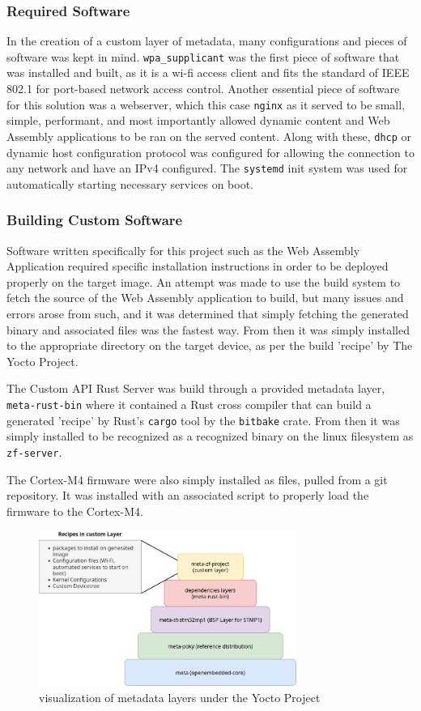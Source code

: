 \documentclass[12pt]{article}
\begin{document}
\subsubsection{Required Software}
In the creation of a custom layer of metadata, many configurations and pieces of software was kept in mind.
\verb+wpa_supplicant+ was the first piece of software that was installed and built, as it is a wi-fi access client
and fits the standard of IEEE 802.1 for port-based network access control. Another essential piece of software
for this solution was a webserver, which this case \verb+nginx+ as it served to be small, simple, performant, and most importantly
allowed dynamic content and Web Assembly applications to be ran on the served content. Along with these, \verb+dhcp+ or 
dynamic host configuration protocol was configured for allowing the connection to any network and have an IPv4 configured.
The \verb+systemd+ init system was used for automatically starting necessary services on boot.

\subsubsection{Building Custom Software}
Software written specifically for this project such as the Web Assembly Application required specific installation
instructions in order to be deployed properly on the target image. An attempt was made to use the build system to
fetch the source of the Web Assembly application to build, but many issues and errors arose from such, and it was
determined that simply fetching the generated binary and associated files was the fastest way. From then it was simply installed
to the appropriate directory on the target device, as per the build 'recipe' by The Yocto Project.

The Custom API Rust Server was build through a provided metadata layer, \verb+meta-rust-bin+ where it contained
a Rust cross compiler that can build a generated 'recipe' by Rust's \verb+cargo+ tool by the \verb+bitbake+ crate. From
then it was simply installed to be recognized as a recognized binary on the linux filesystem as \verb+zf-server+.

The Cortex-M4 firmware were also simply installed as files, pulled from a git repository. It was installed with
an associated script to properly load the firmware to the Cortex-M4.

\begin{figure}[H]
  \includegraphics[width=0.75\textwidth]{../assets/layers.png}
  \caption{visualization of metadata layers under the Yocto Project}
\end{figure}
\end{document}
